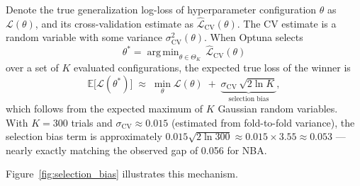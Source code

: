 \documentclass[conference]{IEEEtran}
\DeclareMathOperator*{\argmin}{arg\,min}
\begin{document}
Denote the true generalization log-loss of hyperparameter
configuration $\theta$ as $\mathcal{L}(\theta)$, and its
cross-validation estimate as $\hat{\mathcal{L}}_\text{CV}(\theta)$.
The CV estimate is a random variable with some variance
$\sigma^2_\text{CV}(\theta)$.  When Optuna selects
\[
  \theta^* = \argmin_{\theta \in \Theta_K}\,\hat{\mathcal{L}}_\text{CV}(\theta)
\]
over a set of $K$ evaluated configurations, the expected
true loss of the winner is
\begin{equation}
\mathbb{E}\bigl[\mathcal{L}(\theta^*)\bigr]
  \;\approx\;
  \min_\theta \mathcal{L}(\theta)
  \;+\;
  \underbrace{\sigma_\text{CV}\,\sqrt{2\ln K}}_{\text{selection bias}},
\label{eq:selection_bias}
\end{equation}
which follows from the expected maximum of $K$ Gaussian random
variables.  With $K{=}300$ trials and
$\sigma_\text{CV}{\approx}0.015$ (estimated from fold-to-fold
variance), the selection bias term is approximately
$0.015\sqrt{2\ln 300} \approx 0.015 \times 3.55 \approx 0.053$ —
nearly exactly matching the observed gap of 0.056 for NBA.

Figure~\ref{fig:selection_bias} illustrates this mechanism.
\end{document}
